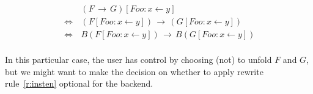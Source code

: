 \documentclass[a4paper]{article}
\newcommand{\impl}[0]{\,\rightarrow\,}
\newcommand{\liff}[0]{\,\Leftrightarrow\,}
\newcommand{\substin}[2]{[#1:#2]}
\newcommand{\iwith}{\leftarrow}
\theoremstyle{definition}
\begin{document}
\[
\begin{array}{ll}
  & (F \impl G) \substin{Foo}{x \iwith y} \\
  \liff & (F\substin{Foo}{x \iwith y}) \impl (G \substin{Foo}{x \iwith y})\\
  \liff & B(F\substin{Foo}{x \iwith y}) \impl B(G \substin{Foo}{x \iwith y})\\
\end{array}
\]


In this particular case, the user has control by choosing (not) to unfold $F$
 and $G$, but we might want to make the decision on whether to apply rewrite
 rule~\ref{r:insten} optional for the backend.



%
%
%
\end{document}
